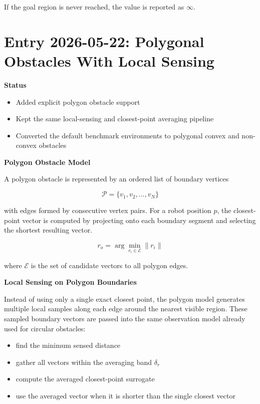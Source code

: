 \documentclass[11pt]{article}
\begin{document}
If the goal region is never reached, the value is reported as $\infty$.

\section*{Entry 2026-05-22: Polygonal Obstacles With Local Sensing}

\textbf{Status}

\begin{itemize}[leftmargin=*]
  \item Added explicit polygon obstacle support
  \item Kept the same local-sensing and closest-point averaging pipeline
  \item Converted the default benchmark environments to polygonal convex and non-convex obstacles
\end{itemize}

\textbf{Polygon Obstacle Model}

A polygon obstacle is represented by an ordered list of boundary vertices

\begin{equation}
\mathcal{P} = \{ v_1, v_2, \dots, v_N \}
\end{equation}

with edges formed by consecutive vertex pairs. For a robot position $p$, the
closest-point vector is computed by projecting onto each boundary segment and
selecting the shortest resulting vector.

\begin{equation}
r_o = \arg\min_{r_i \in \mathcal{E}} \lVert r_i \rVert
\end{equation}

where $\mathcal{E}$ is the set of candidate vectors to all polygon edges.

\textbf{Local Sensing on Polygon Boundaries}

Instead of using only a single exact closest point, the polygon model generates
multiple local samples along each edge around the nearest visible region. These
sampled boundary vectors are passed into the same observation model already used
for circular obstacles:

\begin{itemize}[leftmargin=*]
  \item find the minimum sensed distance
  \item gather all vectors within the averaging band $\delta_r$
  \item compute the averaged closest-point surrogate
  \item use the averaged vector when it is shorter than the single closest vector
\end{itemize}
\end{document}
